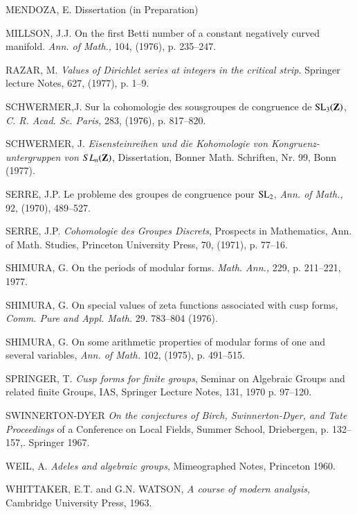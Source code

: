 \begin{thebibliography}{99}
 MENDOZA, E. Dissertation (in Preparation)

 MILLSON, J.J. On the first Betti number of a constant negatively curved manifold. {\em Ann. of Math.,} 104, (1976), p. 235--247.

 RAZAR, M. {\em Values of Dirichlet series at integers in the critical strip.} Springer lecture Notes, 627, (1977), p. 1--9.

 SCHWERMER,\pageoriginale J. Sur la cohomologie des sousgroupes de congruence de $\mathrm{SL}_{3}(\mathbf{Z})$, {\em C. R. Acad. Sc. Paris,} 283, (1976), p. 817--820.

 SCHWERMER, J. {\em Eisensteinreihen und die Kohomologie von Kongruenz-untergruppen von $SL_{n}(\mathbf{Z})$}, Dissertation, Bonner Math. Schriften, Nr. 99, Bonn (1977).

 SERRE, J.P. Le probleme des groupes de congruence pour $\mathrm{SL}_{2}$, {\em Ann. of Math.,} 92, (1970), 489--527.

 SERRE, J.P. {\em Cohomologie des Groupes Discrets}, Prospects in Mathematics, Ann. of Math. Studies, Princeton University Press, 70, (1971), p. 77--16.

 SHIMURA, G. On the periods of modular forms. {\em Math. Ann.,} 229, p. 211--221, 1977.

 SHIMURA, G. On special values of zeta functions associated with cusp forms, {\em Comm. Pure and Appl. Math.} 29. 783--804 (1976).

 SHIMURA, G. On some arithmetic properties of modular forms of one and several variables, {\em Ann. of Math.} 102, (1975), p. 491--515.

 SPRINGER, T. {\em Cusp forms for finite groups}, Seminar on Algebraic Groups and related finite Groups, IAS, Springer Lecture Notes, 131, 1970 p. 97--120.

 SWINNERTON-DYER {\em On the conjectures of Birch, Swinnerton-Dyer, and Tate Proceedings} of a Conference on Local Fields, Summer School, Driebergen, p. 132--157,. Springer 1967.

 WEIL, A. {\em Adeles and algebraic groups}, Mimeographed Notes, Princeton 1960.

 WHITTAKER, E.T. and G.N. WATSON, {\em A course of modern analysis,} Cambridge University Press, 1963.

\end{thebibliography}
